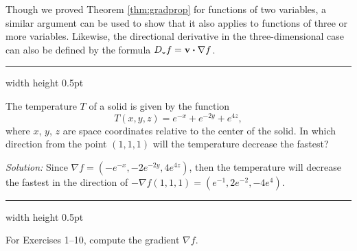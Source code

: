 Though we proved Theorem \ref{thm:gradprop} for functions of two variables, a similar argument can be used to show
that it also applies to functions of three or more variables. Likewise, the directional derivative in the
three-dimensional case can also be defined by the formula $D_{\scriptscriptstyle \textbf{v}}f =
\textbf{v} \bm{\cdot} \nabla f$.

\vspace{3mm}
\hrule width \textwidth height 0.5pt
\begin{exmp}
 The temperature $T$ of a solid is given by the function 
 \[T(x,y,z) = e^{-x} + e^{-2y} + e^{4z},\] 
 where
 $x$, $y$, $z$ are space coordinates relative to the center of the solid. In which direction from the point $(1,1,1)$
 will the temperature decrease the fastest?\vspace{1mm}
 \par\noindent\emph{Solution:} Since $\nabla f = (-e^{-x},-2e^{-2y},4e^{4z})$, then the temperature will decrease the
 fastest in the direction of
 $-\nabla f(1,1,1) = (e^{-1},2e^{-2},-4e^4 )$.
\end{exmp}
\hrule width \textwidth height 0.5pt
\newpage
\centerline{}\label{sec2dot4}
\par\noindent For Exercises 1--10, compute the gradient $\nabla f$.
